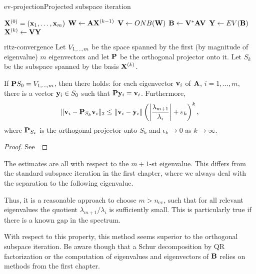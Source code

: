 \begin{Algorithm*}{ev-projection}{Projected subspace iteration}
  \begin{algorithmic}[1]
    \Require $\matx^{(0)} = (\vx_1,\dots,\vx_m)$
    \State $\matw \gets \mata\matx^{(k-1)}$
    \State $\matv \gets ONB(\matw)$ 
    \State $\matb \gets \matv^*\mata\matv$ 
    \State $\maty \gets EV(\matb)$ 
    \State $\matx^{(k)} \gets \matv\maty$
    \EndFor
  \end{algorithmic}
\end{Algorithm*}

\begin{Theorem}{ritz-convergence}
  Let $\esp{1,\dots,m}$ be the space spanned by the first (by
  magnitude of eigenvalue) $m$ eigenvectors and let $\matp$ be the
  orthogonal projector onto it. Let $S_k$ be the subspace spanned by
  the basis $\matx^{(k)}$.
  
  If $\matp S_0 = \esp{1,\dots,m}$, then there holds: for each
  eigenvector $\vv_i$ of $\mata$, $i=1,\dots,m$, there is a vector
  $\vy_i\in S_0$ such that $\matp\vy_i = \vv_i$. Furthermore,
  \begin{gather}
    \norm{\vv_i - \matp_{S_k} \vv_i}_2 \le \norm{\vv_i-\vy_i}
    \left(\abs*{\frac{\lambda_{m+1}}{\lambda_i}}+\epsilon_k\right)^k,
  \end{gather}
  where $\matp_{S_k}$ is the orthogonal projector onto $S_k$ and
  $\epsilon_k\to 0$ as $k \to \infty$.
\end{Theorem}

\begin{proof}
  See~\cite[Theorem 5.2]{Saad11}
\end{proof}

\begin{remark}
  The estimates are all with respect to the $m+1$-st eigenvalue. This
  differs from the standard subspace iteration in the first chapter,
  where we always deal with the separation to the following
  eigenvalue.
  
  Thus, it is a reasonable approach to choose $m > n_{\text{ev}}$,
  such that for all relevant eigenvalues the quotient
  $\lambda_{m+1}/\lambda_i$ is sufficiently small. This is
  particularly true if there is a known gap in the spectrum.

  With respect to this property, this method seems superior to the
  orthogonal subspace iteration. Be aware though that a Schur
  decomposition by QR factorization or the computation of eigenvalues
  and eigenvectors of $\matb$ relies on methods from the first
  chapter.
\end{remark}



